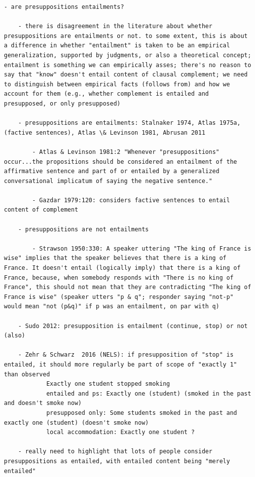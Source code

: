 \documentclass[11pt,fleqn]{article}
\newcommand{\6}{\mbox{$[\hspace*{-.6mm}[$}}
\newcommand{\9}{\mbox{$]\hspace*{-.6mm}]$}}
\begin{document}
{\begin{verbatim}
- are presuppositions entailments?

	- there is disagreement in the literature about whether presuppositions are entailments or not. to some extent, this is about a difference in whether "entailment" is taken to be an empirical generalization, supported by judgments, or also a theoretical concept; entailment is something we can empirically asses; there's no reason to say that "know" doesn't entail content of clausal complement; we need to distinguish between empirical facts (follows from) and how we account for them (e.g., whether complement is entailed and presupposed, or only presupposed)
	
	- presuppositions are entailments: Stalnaker 1974, Atlas 1975a, (factive sentences), Atlas \& Levinson 1981, Abrusan 2011
	
		- Atlas & Levinson 1981:2 "Whenever "presuppositions" occur...the propositions should be considered an entailment of the affirmative sentence and part of or entailed by a generalized conversational implicatum of saying the negative sentence."
		
		- Gazdar 1979:120: considers factive sentences to entail content of complement
		
	- presuppositions are not entailments	
	
		- Strawson 1950:330: A speaker uttering "The king of France is wise" implies that the speaker believes that there is a king of France. It doesn't entail (logically imply) that there is a king of France, because, when somebody responds with "There is no king of France", this should not mean that they are contradicting "The king of France is wise" (speaker utters "p & q"; responder saying "not-p" would mean "not (p&q)" if p was an entailment, on par with q)
		
	- Sudo 2012: presupposition is entailment (continue, stop) or not (also)
	
	- Zehr & Schwarz  2016 (NELS): if presupposition of "stop" is entailed, it should more regularly be part of scope of "exactly 1" than observed
			Exactly one student stopped smoking
			entailed and ps: Exactly one (student) (smoked in the past and doesn't smoke now) 
			presupposed only: Some students smoked in the past and exactly one (student) (doesn't smoke now)
			local accommodation: Exactly one student ?
			
	- really need to highlight that lots of people consider presuppositions as entailed, with entailed content being "merely entailed"
	

\end{verbatim}}
\end{document}
